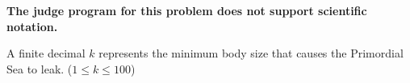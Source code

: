 \textbf{The judge program for this problem does not support scientific notation.}

A finite decimal $k$ represents the minimum body size that causes the Primordial Sea to leak. ($1 \le k \le 100$)